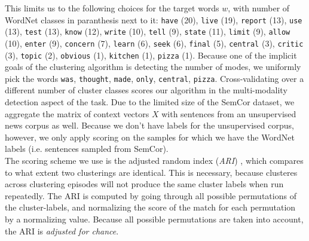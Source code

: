 \documentclass[a4paper,12pt,oneside,openright]{report}
\begin{document}
This limits us to the following choices for the target words $w$, with number of WordNet classes in paranthesis next to it: 
\Verb#have# (20), \Verb#live# (19), \Verb#report# (13), \Verb#use# (13), \Verb#test# (13), \Verb#know# (12), \Verb#write# (10), \Verb#tell# (9), \Verb#state# (11), \Verb#limit# (9), \Verb#allow# (10), \Verb#enter# (9), \Verb#concern# (7), \Verb#learn# (6), \Verb#seek# (6), \Verb#final# (5), \Verb#central# (3), \Verb#critic# (3), \Verb#topic# (2), \Verb#obvious# (1), \Verb#kitchen# (1), \Verb#pizza# (1).
Because one of the implicit goals of the clustering algorithm is detecting the number of modes, we uniformly pick the words \Verb#was#, \Verb#thought#, \Verb#made#, \Verb#only#, \Verb#central#, \Verb#pizza#.
Cross-validating over a different number of cluster classes scores our algorithm in the multi-modality detection aspect of the task.
Due to the limited size of the SemCor dataset, we aggregate the matrix of context vectors $X$ with sentences from an unsupervised news corpus as well.
Because we don't have labels for the unsupervised corpus, however, we only apply scoring on the samples for which we have the WordNet labels (i.e. sentences sampled from SemCor). \\

The scoring scheme we use is the adjusted random index (\textit{ARI}) \cite{rand71}, \cite{hubert85} which compares to what extent two clusterings are identical.
This is necessary, because clusteres across clustering episodes will not produce the same cluster labels when run repeatedly.
The ARI is computed by going through all possible permutations of the cluster-labels, and normalizing the score of the match for each permutation by a normalizing value.
Because all possible permutations are taken into account, the ARI is \textit{adjusted for chance}.
\end{document}
